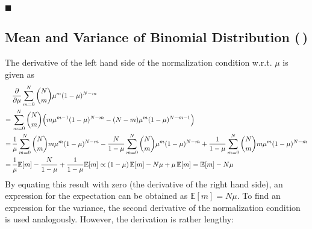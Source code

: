 \documentclass[11pt, a4paper]{scrartcl}
\newcommand{\E}{\mathbb{E}}
\newcommand{\eot}{\hfill\(\blacksquare\)}
\newcommand{\diffstar}{\texorpdfstring{\raisebox{-1pt}{\resizebox{!}{8pt}{\(\star\)}}}{*}}
\newcommand{\twostar}  {(\diffstar\,\diffstar)}
\begin{document}
			\eot

		\subsection{Mean and Variance of Binomial Distribution  \twostar}
			The derivative of the left hand side of the normalization condition w.r.t. \(\mu\) is given as
			\begin{align}
				 &\, \pdv{\mu} \sum_{m = 0}^{N} { N \choose m } \mu^m (1 - \mu)^{N - m} \\
				=&\, \sum_{m = 0}^{N} { N \choose m } \Big( m \mu^{m - 1} (1 - \mu)^{N - m} - (N - m) \mu^m (1 - \mu)^{N - m - 1} \Big) \\
				=&\, \frac{1}{\mu} \sum_{m = 0}^{N} { N \choose m } m \mu^m (1 - \mu)^{N - m} - \frac{N}{1 - \mu} \sum_{m = 0}^{N} { N \choose m } \mu^m (1 - \mu)^{N - m} + \frac{1}{1 - \mu} \sum_{m = 0}^{N} { N \choose m } m \mu^m (1 - \mu)^{N - m} \\
				=&\, \frac{1}{\mu} \E[m] - \frac{N}{1 - \mu} + \frac{1}{1 - \mu} \E[m]
					\propto (1 - \mu) \, \E[m] - N \mu + \mu \, \E[m]
					= \E[m] - N \mu
			\end{align}
			By equating this result with zero (the derivative of the right hand side), an expression for the expectation can be obtained as \( \E[m] = N \mu \). To find an expression for the variance, the second derivative of the normalization condition is used analogously. However, the derivation is rather lengthy:
\end{document}
